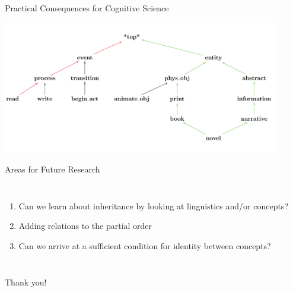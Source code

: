 \documentclass{beamer}
\begin{document}
\begin{frame}{Practical Consequences for Cognitive Science}
\begin{center}
\includegraphics[width=4.75in]{InheritanceNetwork}
\end{center}
\end{frame}


\begin{frame}{Areas for Future Research}
\begin{columns}
\begin{enumerate}
\item Can we learn about inheritance by looking at linguistics and/or concepts?
\vspace{.125in}
\item Adding relations to the partial order
\vspace{.125in}
\item Can we arrive at a sufficient condition for identity between concepts?
\end{enumerate}
\end{columns}
\end{frame}

\begin{frame}
\begin{center}
Thank you!
\end{center}
\end{frame}
\end{document}
